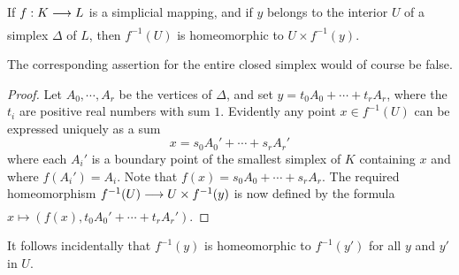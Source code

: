 \documentclass[../main]{subfiles}
\begin{document}
\begin{lemma}
\label{lem:20.05}
If $f:K \varrightarrow{} L$ is a simplicial mapping, and if $y$ belongs to the interior $U$ of a simplex $\Delta$ of $L$, then $f^{-1}(U)$ is homeomorphic to $U \times f^{-1}(y)$.
\end{lemma}
The corresponding assertion for the entire closed simplex would of course be false.
\begin{proof}
Let $A_0,\cdots,A_r$ be the vertices of $\Delta$, and set $y = t_0 A_0 + \cdots + t_rA_r$, where the $t_i$ are positive real numbers with sum $1$. Evidently any point $x \in f^{-1}(U)$ can be expressed uniquely as a sum \[x = s_0 A_0' + \cdots + s_rA_r'\] where each $A_i'$ is a boundary point of the smallest simplex of $K$ containing $x$ and where $f(A_i') = A_i$. Note that $f(x) = s_0A_0 + \cdots + s_rA_r$. The required homeomorphism $f^{-1}(U) \varrightarrow{} U \times f^{-1}(y)$ is now defined by the formula \newline $x \mapsto (f(x),t_0A_0' + \cdots + t_rA_r')$.
\end{proof}

It follows incidentally that $f^{-1}(y)$ is homeomorphic to $f^{-1}(y')$ for all $y$ and $y'$ in $U$.
\end{document}
